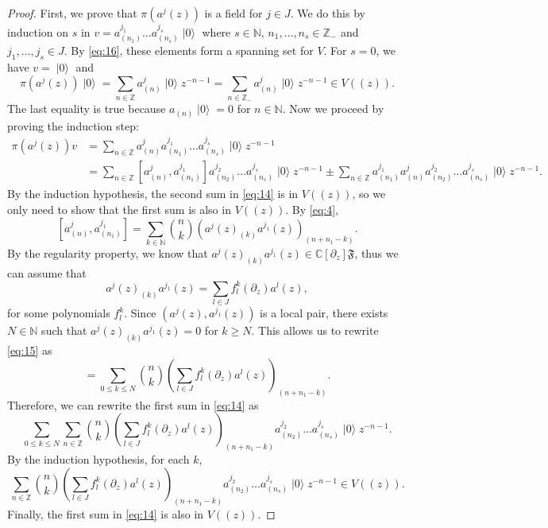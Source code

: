 \documentclass[a4paper, 12pt, reqno]{amsart}
\theoremstyle{remark}
\numberwithin{equation}{subsection}
\DeclareMathOperator{\vac}{|0\rangle}
\begin{document}
\begin{proof}
  First, we prove that $\pi(a^j(z))$ is a field for $j \in J$.
  We do this by induction on $s$ in $v = a^{j_1}_{(n_1)}\dots a^{j_s}_{(n_s)}\vac$ where $s \in \mathbb{N}$, $n_1, \dots, n_s \in \mathbb{Z}_-$ and $j_1, \dots, j_s \in J$.
  By \eqref{eq:16}, these elements form a spanning set for $V$.
  For $s = 0$, we have $v = \vac$ and
  \begin{equation*}
    \pi(a^j(z))\vac = \sum_{n \in \mathbb{Z}} a^j_{(n)}\vac z^{-n - 1} = \sum_{n \in \mathbb{Z}_-} a^j_{(n)}\vac z^{-n - 1} \in V((z)).
  \end{equation*}
  The last equality is true because $a_{(n)}\vac = 0$ for $n \in \mathbb{N}$.
  Now we proceed by proving the induction step:
  \begin{align}
    \nonumber
    \pi(a^j(z))v &= \sum_{n \in \mathbb{Z}}a^j_{(n)}a^{j_1}_{(n_1)}\dots a^{j_s}_{(n_s)}\vac z^{-n - 1} \\
    \label{eq:14}
    &= \sum_{n \in \mathbb{Z}} [a^j_{(n)}, a^{j_1}_{(n_1)}]a^{j_2}_{(n_2)}\dots a^{j_s}_{(n_s)}\vac z^{-n - 1} \pm \sum_{n \in \mathbb{Z}}a^{j_1}_{(n_1)}a^j_{(n)}a^{j_2}_{(n_2)}\dots a^{j_s}_{(n_s)}\vac z^{-n - 1}.
  \end{align}
  By the induction hypothesis, the second sum in \eqref{eq:14} is in $V((z))$, so we only need to show that the first sum is also in $V((z))$.
  By \eqref{eq:4},
  \begin{equation}
    \label{eq:15}
    [a^j_{(n)}, a^{j_1}_{(n_1)}] = \sum_{k \in \mathbb{N}}\binom{n}{k}(a^j(z)_{(k)}a^{j_1}(z))_{(n + n_1 - k)}.
  \end{equation}
  By the regularity property, we know that $a^j(z)_{(k)}a^{j_1}(z) \in \mathbb{C}[\partial_z]\mathfrak{F}$, thus we can assume that
  \begin{equation*}
    a^j(z)_{(k)}a^{j_1}(z) = \sum_{l \in J}f^k_l(\partial_z)a^l(z),
  \end{equation*}
  for some polynomials $f^k_l$.
  Since $(a^j(z), a^{j_1}(z))$ is a local pair, there exists $N \in \mathbb{N}$ such that $a^j(z)_{(k)}a^{j_1}(z) = 0$ for $k \ge N$.
  This allows us to rewrite \eqref{eq:15} as
  \begin{equation*}
    [a^j_{(n)}, a^{j_1}_{(n_1)}] = \sum_{0 \le k \le N}\binom{n}{k}\left(\sum_{l \in J}f^k_l(\partial_z)a^l(z)\right)_{(n + n_1 - k)}.
  \end{equation*}
  Therefore, we can rewrite the first sum in \eqref{eq:14} as
  \begin{equation*}
    \sum_{0 \le k \le N}\sum_{n \in \mathbb{Z}}\binom{n}{k}\left(\sum_{l \in J}f^k_l(\partial_z)a^l(z)\right)_{(n + n_1 - k)}a^{j_2}_{(n_2)}\dots a^{j_s}_{(n_s)}\vac z^{-n - 1}.
  \end{equation*}
  By the induction hypothesis, for each $k$,
  \begin{equation*}
    \sum_{n \in \mathbb{Z}}\binom{n}{k}\left(\sum_{l \in J}f^k_l(\partial_z)a^l(z)\right)_{(n + n_1 - k)}a^{j_2}_{(n_2)}\dots a^{j_s}_{(n_s)}\vac z^{-n - 1} \in V((z)).
  \end{equation*}
  Finally, the first sum in \eqref{eq:14} is also in $V((z))$.


\end{proof}
\end{document}
